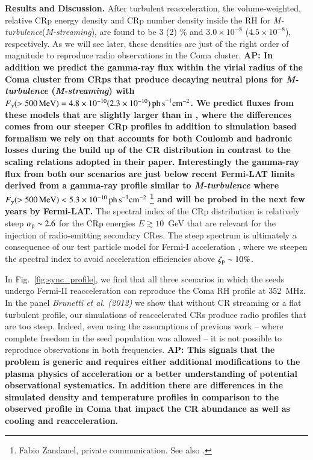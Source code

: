 \documentclass[useAMS,usenatbib]{mn2e}
\newcommand{\Mstream}{{\it M-streaming}\xspace}
\newcommand{\Mflatturb}{{\it M-turbulence}\xspace}
\def\AP#1{{\bf  AP: #1}}
\begin{document}
{\bf Results and Discussion.} After turbulent reacceleration, the
volume-weighted, relative CRp energy density and CRp number density
inside the RH for \Mflatturb (\Mstream), are found to be 3 (2) \% and
$3.0\times10^{-8}$ ($4.5\times10^{-8}$), respectively. As we will see
later, these densities are just of the right order of magnitude to
reproduce radio observations in the Coma cluster. \AP{In addition we
  predict the gamma-ray flux within the virial radius of the Coma
  cluster from CRps that produce decaying neutral pions for \Mflatturb
  (\Mstream) with $F_\gamma(>500\,{\mathrm{MeV}})=4.8\times10^{-10}
  (2.3\times10^{-10}) \mathrm{ \,ph\, s}^{-1}\mathrm{cm}^{-2}$. We
  predict fluxes from these models that are slightly larger than in
  \cite{brunetti12}, where the differences comes from our steeper CRp
  profiles in addition to simulation based formalism we rely on that
  accounts for both Coulomb and hadronic losses during the build up of
  the CR distribution in contrast to the scaling relations adopted in
  their paper. Interestingly the gamma-ray flux from both our
  scenarios are just below recent Fermi-LAT limits derived from a
  gamma-ray profile similar to \Mflatturb where
  $F_\gamma(>500\,{\mathrm{MeV}})<5.3\times10^{-10} \mathrm{ \,ph\,
    s}^{-1}\mathrm{cm}^{-2}$ \footnote{Fabio Zandanel, private
    communication. See also
    \citep{2014MNRAS.440..663Z,2014ApJ...787...18A}.} and will be
  probed in the next few years by Fermi-LAT. } The spectral index of
the CRp distribution is relatively steep $\alpha_{{\mathrm{p}}}\sim2.6$ for
the CRp energies $E \gtrsim 10$~GeV that are relevant for the
injection of radio-emitting secondary CRes.  The steep spectrum is
ultimately a consequence of our test particle model for Fermi-I
acceleration \citep{pinzke13}, where we steepen the spectral index to
avoid acceleration efficiencies above $\zeta_{{\mathrm{p}}} \sim 10\%$.

In Fig.~\ref{fig:sync_profile}, we find that all three scenarios in
which the seeds undergo Fermi-II reacceleration can reproduce the Coma
RH profile at 352~MHz. In the panel {\it Brunetti et al. (2012)} we
show that without CR streaming or a flat turbulent profile, our
simulations of reaccelerated CRs produce radio profiles that are too
steep. Indeed, even using the assumptions of previous work -- where
complete freedom in the seed population was allowed -- it is not
possible to reproduce observations in both frequencies. \AP{This
  signals that the problem is generic and requires either additional
  modifications to the plasma physics of acceleration or a better
  understanding of potential observational systematics. In addition
  there are differences in the simulated density and temperature
  profiles in comparison to the observed profile in Coma that impact
  the CR abundance as well as cooling and reacceleration.}
\end{document}
